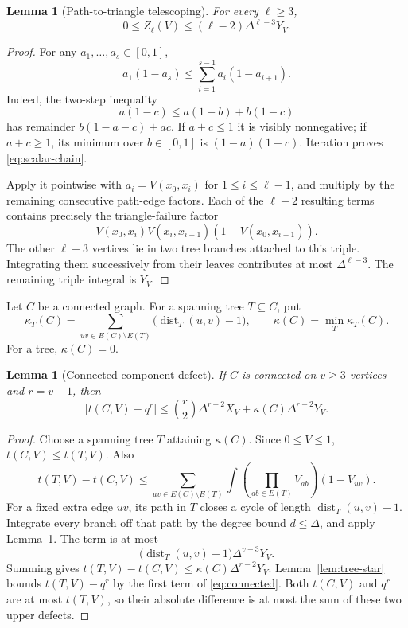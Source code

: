 \documentclass[11pt]{article}
\newtheorem{lemma}[theorem]{Lemma}
\begin{document}
\begin{lemma}[Path-to-triangle telescoping]
\label{lem:path-triangle}
For every $\ell\geq3$,
\begin{equation}
 0\leq Z_\ell(V)\leq(\ell-2)\Delta^{\ell-3}Y_V.
 \label{eq:path-triangle}
\end{equation}
\end{lemma}

\begin{proof}
For any $a_1,\ldots,a_s\in[0,1]$,
\begin{equation}
 a_1(1-a_s)\leq\sum_{i=1}^{s-1}a_i(1-a_{i+1}).
 \label{eq:scalar-chain}
\end{equation}
Indeed, the two-step inequality
\[
 a(1-c)\leq a(1-b)+b(1-c)
\]
has remainder $b(1-a-c)+ac$.  If $a+c\leq1$ it is visibly nonnegative;
if $a+c\geq1$, its minimum over $b\in[0,1]$ is
$(1-a)(1-c)$.  Iteration proves \eqref{eq:scalar-chain}.

Apply it pointwise with $a_i=V(x_0,x_i)$ for
$1\leq i\leq\ell-1$, and multiply by the remaining consecutive path-edge
factors.  Each of the $\ell-2$ resulting terms contains precisely the
triangle-failure factor
\[
 V(x_0,x_i)V(x_i,x_{i+1})(1-V(x_0,x_{i+1})).
\]
The other $\ell-3$ vertices lie in two tree branches attached to this
triple.  Integrating them successively from their leaves contributes at most
$\Delta^{\ell-3}$.  The remaining triple integral is $Y_V$.
\end{proof}

Let $C$ be a connected graph.  For a spanning tree $T\subseteq C$, put
\[
 \kappa_T(C)=\sum_{uv\in E(C)\setminus E(T)}
 \bigl(\operatorname{dist}_T(u,v)-1\bigr),
 \qquad
 \kappa(C)=\min_T\kappa_T(C).
\]
For a tree, $\kappa(C)=0$.

\begin{lemma}[Connected-component defect]
\label{lem:connected}
If $C$ is connected on $v\geq3$ vertices and $r=v-1$, then
\begin{equation}
 \left|t(C,V)-q^r\right|
 \leq \binom r2\Delta^{r-2}X_V
      +\kappa(C)\Delta^{r-2}Y_V.
 \label{eq:connected}
\end{equation}
\end{lemma}

\begin{proof}
Choose a spanning tree $T$ attaining $\kappa(C)$.  Since $0\leq V\leq1$,
$t(C,V)\leq t(T,V)$.  Also
\[
 t(T,V)-t(C,V)
 \leq\sum_{uv\in E(C)\setminus E(T)}
 \int\left(\prod_{ab\in E(T)}V_{ab}\right)(1-V_{uv}).
\]
For a fixed extra edge $uv$, its path in $T$ closes a cycle of length
$\operatorname{dist}_T(u,v)+1$.  Integrate every branch off that path by the
degree bound $d\leq\Delta$, and apply Lemma~\ref{lem:path-triangle}.  The term
is at most
\[
 \bigl(\operatorname{dist}_T(u,v)-1\bigr)
 \Delta^{v-3}Y_V.
\]
Summing gives
$t(T,V)-t(C,V)\leq\kappa(C)\Delta^{r-2}Y_V$.
Lemma~\ref{lem:tree-star} bounds
$t(T,V)-q^r$ by the first term of \eqref{eq:connected}.  Both $t(C,V)$ and
$q^r$ are at most $t(T,V)$, so their absolute difference is at most the sum
of these two upper defects.
\end{proof}
\end{document}
